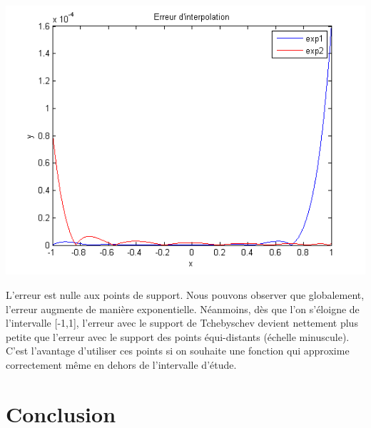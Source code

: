 \documentclass[a4paper,10pt]{report}
\begin{document}
\begin{center}
	\includegraphics[scale=0.8]{zoomErreur.png} 
\end{center}

L'erreur est nulle aux points de support. Nous pouvons observer que globalement, l'erreur augmente de manière exponentielle. Néanmoins, dès que l'on s'éloigne de l'intervalle [-1,1], l'erreur avec le support de Tchebyschev devient nettement plus petite que l'erreur avec le support des points équi-distants (échelle minuscule). C'est l'avantage d'utiliser ces points si on souhaite une fonction qui approxime correctement même en dehors de l'intervalle d'étude.

\chapter*{Conclusion}
\end{document}
